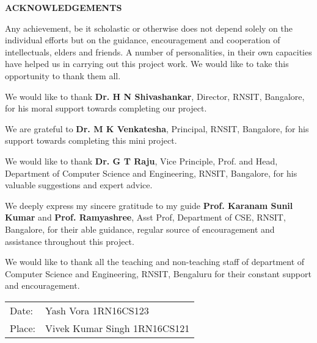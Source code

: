 \thispagestyle{empty}
\begin{center}
\textup{\Large{\textbf{ACKNOWLEDGEMENTS}}} \\[0.1in]
\end{center}

\justify
\indent
Any achievement, be it scholastic or otherwise does not depend solely on the individual efforts but on the guidance, encouragement and cooperation of intellectuals, elders and friends. A number of personalities, in their own capacities have helped us in carrying out this project work. We would like to take this opportunity to thank them all. 

We would like to thank \textbf{Dr. H N Shivashankar}, Director, RNSIT, Bangalore, for his moral support towards completing our project.

We are grateful to \textbf{Dr. M K Venkatesha}, Principal, RNSIT, Bangalore, for his support towards completing this mini project. 

We would like to thank \textbf{Dr. G T Raju}, Vice Principle, Prof. and Head, Department of Computer Science and Engineering, RNSIT, Bangalore, for his valuable suggestions and expert advice. 

We deeply express my sincere gratitude to my guide \textbf{Prof. Karanam Sunil Kumar} and \textbf{Prof. Ramyashree}, Asst Prof, Department of CSE, RNSIT, Bangalore, for their able guidance, regular source of encouragement and assistance throughout this project. 

We would like to thank all the teaching and non-teaching staff of department of Computer Science and Engineering, RNSIT, Bengaluru for their constant support and encouragement.

\vfill

\justify
\begin{tabularx}{\linewidth}{X X}
\textup{Date:} & {\hfill}\textup{Yash Vora 1RN16CS123}\\
\textup{Place:} & {\hfill}\textup{Vivek Kumar Singh 1RN16CS121}\\
\end{tabularx}

\pagebreak